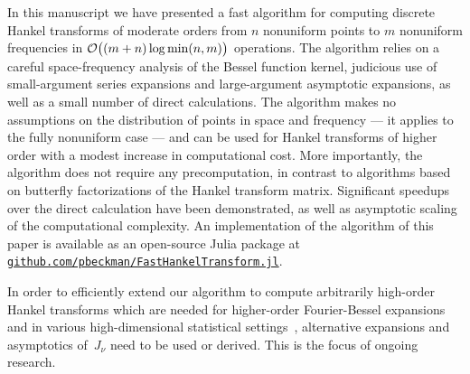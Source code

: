 
In this manuscript we have presented a fast algorithm for computing discrete Hankel
transforms of moderate orders from $n$ nonuniform points to $m$ nonuniform
frequencies in $\mathcal{O}\big((m+n)\log\min(n,m)\big)$ operations. The algorithm
relies on a careful space-frequency analysis of the Bessel function kernel,
judicious use of small-argument series expansions and large-argument asymptotic
expansions, as well as a small number of direct calculations. The algorithm
makes no assumptions on the distribution of points in space and frequency --- it
applies to the fully nonuniform case --- and can be used for Hankel transforms
of higher order with a modest increase in computational cost. More importantly,
the algorithm does not require any precomputation, in contrast to algorithms
based on butterfly factorizations of the Hankel transform matrix. Significant
speedups over the direct calculation have been demonstrated, as well as
asymptotic scaling of the computational complexity. An implementation of the
algorithm of this paper is available as an open-source Julia package at
\href{https://github.com/pbeckman/FastHankelTransform.jl}{\texttt{github.com/pbeckman/FastHankelTransform.jl}}.

In order to efficiently extend our algorithm to compute arbitrarily high-order
Hankel transforms which are needed for higher-order Fourier-Bessel expansions
and in various high-dimensional statistical
settings~\cite{lord1954a,nolan2013multivariate}, alternative expansions and
asymptotics of~$J_\nu$ need to be used or derived. This is the focus of ongoing
research.



